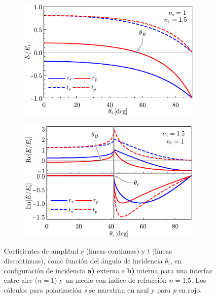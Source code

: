 \begin{figure}[h!]\centering\hspace*{-1.5em}
	\begin{subfigure}{.05\textwidth}\vspace{-4.5cm}\caption{}\label{sfig:coefExt}\end{subfigure}
	\begin{subfigure}{.43\textwidth} \hspace*{-.8cm}
	\includegraphics[scale=1]{1-Teoria/figs/1-1-ampCoefExt}
	\end{subfigure}
	\begin{subfigure}{.05\textwidth}\vspace{-4.5cm}\caption{}\label{sfig:coefInt}\end{subfigure}
	\begin{subfigure}{.43\textwidth} \hspace*{-.9cm}
	\includegraphics[scale=1]{1-Teoria/figs/1-1-ampCoefInt}
	\end{subfigure}\vspace*{-.7em}
	\caption{ Coeficientes de amplitud $r$ (líneas continuas) y $t$ (líneas discontinuas), como función del ángulo de incidencia $\theta_i$, en configuración de incidencia \textbf{a)} externa e \textbf{b)} interna para una interfaz entre  aire ($n=1$) y un medio con índice de refracción $n = 1.5$. Los cálculos para polarización  \emph{s} se muestran  en azul y  para \emph{p} en rojo. }	\label{fig:coefAmp}	
	\end{figure}	
%

